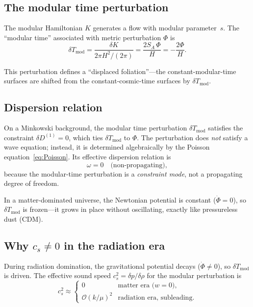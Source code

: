 \documentclass[aps,prd,preprint,superscriptaddress,longbibliography]{revtex4-2}
\newcommand{\KL}{D}
\begin{document}
\subsection{The modular time perturbation}

The modular Hamiltonian $K$ generates a flow with modular parameter~$s$.
The ``modular time'' associated with metric perturbation $\Phi$ is
\begin{equation}
\delta T_{\mathrm{mod}} = \frac{\delta K}{2\pi H^2/(2\pi)}
= \frac{2S_A\,\Phi}{H} = -\frac{2\Phi}{H}.
\label{eq:delta_T_mod}
\end{equation}

This perturbation defines a ``displaced foliation''---the
constant-modular-time surfaces are shifted from the constant-cosmic-time
surfaces by $\delta T_{\mathrm{mod}}$.

\subsection{Dispersion relation}

On a Minkowski background, the modular time perturbation
$\delta T_{\mathrm{mod}}$ satisfies the constraint
$\delta\KL^{(1)} = 0$, which ties $\delta T_{\mathrm{mod}}$ to
$\Phi$.  The perturbation does \emph{not} satisfy a wave equation;
instead, it is determined algebraically by the Poisson
equation~\eqref{eq:Poisson}.  Its effective dispersion relation is
\begin{equation}
\omega = 0 \quad\text{(non-propagating)},
\label{eq:cs0}
\end{equation}
because the modular-time perturbation is a \emph{constraint mode},
not a propagating degree of freedom.

In a matter-dominated universe, the Newtonian potential is constant
($\dot{\Phi}=0$), so $\delta T_{\mathrm{mod}}$ is frozen---it grows
in place without oscillating, exactly like pressureless dust (CDM).

\subsection{Why $c_s \neq 0$ in the radiation era}

During radiation domination, the gravitational potential decays
($\dot{\Phi}\neq 0$), so $\delta T_{\mathrm{mod}}$ is driven.
The effective sound speed
$c_s^2 = \delta p/\delta\rho$ for the modular perturbation is
\begin{equation}
c_s^2 \approx \begin{cases}
0 & \text{matter era (}w=0\text{)},\\
\mathcal{O}(k/\mu)^2 & \text{radiation era, subleading}.
\end{cases}
\label{eq:cs_rad}
\end{equation}
\end{document}
